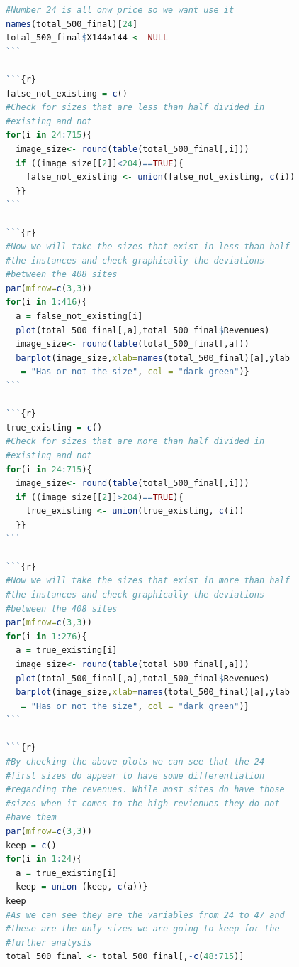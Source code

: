 \documentclass{article}
\begin{document}
\begin{lstlisting}[language=R]
#Number 24 is all onw price so we want use it
names(total_500_final)[24]
total_500_final$X144x144 <- NULL
```

```{r}
false_not_existing = c()
#Check for sizes that are less than half divided in 
#existing and not
for(i in 24:715){
  image_size<- round(table(total_500_final[,i]))
  if ((image_size[[2]]<204)==TRUE){
    false_not_existing <- union(false_not_existing, c(i))
  }}
```

```{r}
#Now we will take the sizes that exist in less than half 
#the instances and check graphically the deviations 
#between the 408 sites
par(mfrow=c(3,3))
for(i in 1:416){
  a = false_not_existing[i]
  plot(total_500_final[,a],total_500_final$Revenues)
  image_size<- round(table(total_500_final[,a]))
  barplot(image_size,xlab=names(total_500_final)[a],ylab
   = "Has or not the size", col = "dark green")}
```

```{r}
true_existing = c()
#Check for sizes that are more than half divided in 
#existing and not
for(i in 24:715){
  image_size<- round(table(total_500_final[,i]))
  if ((image_size[[2]]>204)==TRUE){
    true_existing <- union(true_existing, c(i))
  }}
```

```{r}
#Now we will take the sizes that exist in more than half 
#the instances and check graphically the deviations 
#between the 408 sites
par(mfrow=c(3,3))
for(i in 1:276){
  a = true_existing[i]
  image_size<- round(table(total_500_final[,a]))
  plot(total_500_final[,a],total_500_final$Revenues)
  barplot(image_size,xlab=names(total_500_final)[a],ylab
   = "Has or not the size", col = "dark green")}
```

```{r}
#By checking the above plots we can see that the 24 
#first sizes do appear to have some differentiation 
#regarding the revenues. While most sites do have those 
#sizes when it comes to the high revienues they do not 
#have them
par(mfrow=c(3,3))
keep = c()
for(i in 1:24){
  a = true_existing[i]
  keep = union (keep, c(a))}
keep
#As we can see they are the variables from 24 to 47 and 
#these are the only sizes we are going to keep for the 
#further analysis
total_500_final <- total_500_final[,-c(48:715)]
\end{lstlisting} 
\end{document}
